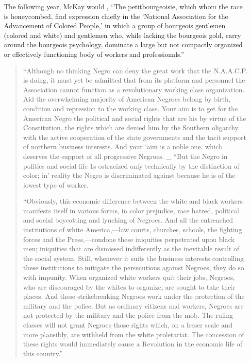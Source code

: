 \documentclass[letterpaper,10pt,english]{jupyterBook}
\begin{document}
\begin{sphinxShadowBox}
\sphinxstylesidebartitle{}

\sphinxAtStartPar
The following year, McKay would , “The petit\sphinxhyphen{}bourgeoisie, which whom the race is honeycombed, find expression chiefly in the ‘National Association for the Advancement of Colored People,’ in which a group of bourgeois gentlemen (colored and white) and gentlemen who, while lacking the bourgeois gold, carry around the bourgeois psychology, dominate a large but not compactly organized or effectively functioning body of workers and professionals.”
\end{sphinxShadowBox}
\begin{quote}

\sphinxAtStartPar
“Although no thinking Negro can deny the great work that the N.A.A.C.P. is doing, it must yet be admitted that from its platform and personnel the Association cannot function as a revolutionary working class organization. Aid the overwhelming majority of American Negroes belong by birth, condition and repression to the working class. Your aim is to get for the American Negro the political and social rights that are his by virtue of the Constitution, the rights which are denied him by the Southern oligarchy with the active cooperation of the state governments and the tacit support of northern business interests. And your ‘aim is a noble one, which deserves the support of all progressive Negroes. \_ “But the Negro in politics and social life 1s ostracized only technically by the distinction of color; in’ reality the Negro is discriminated against because he is of the lowest type of worker.
 

\sphinxAtStartPar
“Obviously, this economic difference between the white and black workers manifests itself in various forms, in color prejudice, race hatred, political and social boycotting and lynching of Negroes. And all the entrenched institutions of white America,—law courts, churches, schools, the fighting forces and the Press,—condone these iniquities perpetrated upon black men; iniquities that are dismissed indifferently as the inevitable result of the social system. Still, whenever it suits the business interests controlling these institutions to mitigate the persecutions against Negroes, they do so with impunity. When organized white workers quit their jobs, Negroes, who are discouraged by the whites to organize, are sought to take their places. And these strike\sphinxhyphen{}breaking Negroes work under the protection of the military and the police. But as ordinary citizens and workers, Negroes are not protected by the military and the police from the mob. The ruling classes will not grant Negroes those rights which, on a lesser scale and more plausibly, are withheld from the white proletariat. The concession of these rights would immediately cause a Revolution in the economic life of this country.”
\end{quote}
\end{document}
